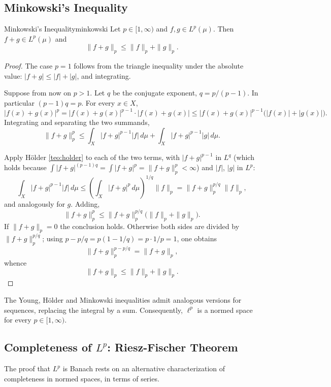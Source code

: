 \documentclass[11pt, a4paper]{article}
\begin{document}
\subsection{Minkowski's Inequality}

\begin{teorema}{Minkowski's Inequality}{minkowski}
Let $p \in [1, \infty)$ and $f, g \in L^p(\mu)$. Then $f + g \in L^p(\mu)$ and
$$ \|f + g\|_p \le \|f\|_p + \|g\|_p. $$
\end{teorema}

\begin{proof}
The case $p = 1$ follows from the triangle inequality under the absolute value: $|f + g| \le |f| + |g|$,
and integrating.

Suppose from now on $p > 1$. Let $q$ be the conjugate exponent, $q = p/(p-1)$. In particular
$(p - 1)q = p$. For every $x \in X$,
$$ |f(x) + g(x)|^p = |f(x) + g(x)|^{p-1} \cdot |f(x) + g(x)| \le |f(x) + g(x)|^{p-1}
\big(|f(x)| + |g(x)|\big). $$
Integrating and separating the two summands,
$$ \|f + g\|_p^p \le \int_X |f + g|^{p-1} |f| \, d\mu + \int_X |f + g|^{p-1} |g| \, d\mu. $$

Apply H\"older \ref{teo:holder} to each of the two terms, with $|f + g|^{p-1}$ in $L^q$ (which holds
because $\int |f + g|^{(p-1)q} = \int |f + g|^p = \|f + g\|_p^p < \infty$) and $|f|$, $|g|$ in $L^p$:
$$ \int_X |f + g|^{p-1} |f| \, d\mu \le \left(\int_X |f + g|^p \, d\mu\right)^{1/q} \|f\|_p
= \|f + g\|_p^{p/q} \|f\|_p, $$
and analogously for $g$. Adding,
$$ \|f + g\|_p^p \le \|f + g\|_p^{p/q} \big(\|f\|_p + \|g\|_p\big). $$
If $\|f + g\|_p = 0$ the conclusion holds. Otherwise both sides are divided by
$\|f + g\|_p^{p/q}$; using $p - p/q = p(1 - 1/q) = p \cdot 1/p = 1$, one obtains
$$ \|f + g\|_p^{p - p/q} = \|f + g\|_p, $$
whence
$$ \|f + g\|_p \le \|f\|_p + \|g\|_p. $$
\end{proof}

\obs The Young, H\"older and Minkowski inequalities admit analogous versions for sequences,
replacing the integral by a sum. Consequently, $\ell^p$ is a normed space for every
$p \in [1, \infty)$.

\subsection{\texorpdfstring{Completeness of $L^p$: Riesz-Fischer Theorem}{Completeness of Lp:
Riesz-Fischer Theorem}}

The proof that $L^p$ is Banach rests on an alternative characterization of
completeness in normed spaces, in terms of series.
\end{document}
